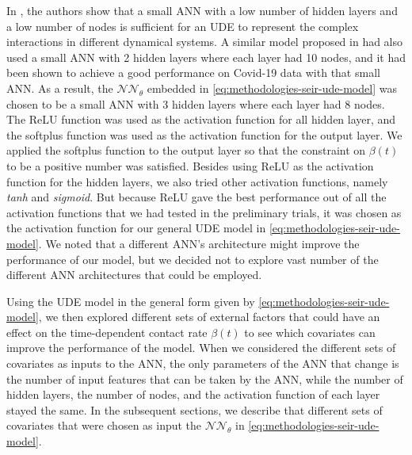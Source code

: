 In \cite{rackauckasUniversalDifferentialEquations2020}, the authors show that a small \gls{ANN} with a low number of hidden layers and a low number of nodes is sufficient for an \gls{UDE} to represent the complex interactions in different dynamical systems.
A similar model proposed in \cite{dandekarMachineLearningAidedGlobal2020a} had also used a small \gls{ANN} with 2 hidden layers where each layer had 10 nodes, and it had been shown to achieve a good performance on Covid-19 data with that small \gls{ANN}.
As a result, the $\mathcal{NN}_\theta$ embedded in \autoref{eq:methodologies-seir-ude-model} was chosen to be a small \gls{ANN} with 3 hidden layers where each layer had 8 nodes.
The \gls{ReLU} function was used as the activation function for all hidden layer, and the softplus function was used as the activation function for the output layer.
We applied the softplus function to the output layer so that the constraint on $\beta(t)$ to be a positive number was satisfied.
Besides using \gls{ReLU} as the activation function for the hidden layers, we also tried other activation functions, namely \textit{tanh} and \textit{sigmoid}.
But because \gls{ReLU} gave the best performance out of all the activation functions that we had tested in the preliminary trials, it was chosen as the activation function for our general \gls{UDE} model in \autoref{eq:methodologies-seir-ude-model}.
We noted that a different \gls{ANN}'s architecture might improve the performance of our model, but we decided not to explore vast number of the different \gls{ANN} architectures that could be employed.

Using the \gls{UDE} model in the general form given by \autoref{eq:methodologies-seir-ude-model}, we then explored different sets of external factors that could have an effect on the time-dependent contact rate $\beta (t)$ to see which covariates can improve the performance of the model.
When we considered the different sets of covariates as inputs to the \gls{ANN}, the only parameters of the \gls{ANN} that change is the number of input features that can be taken by the \gls{ANN}, while the number of hidden layers, the number of nodes, and the activation function of each layer stayed the same.
In the subsequent sections, we describe that different sets of covariates that were chosen as input the $\mathcal{NN}_\theta$ in \autoref{eq:methodologies-seir-ude-model}.

